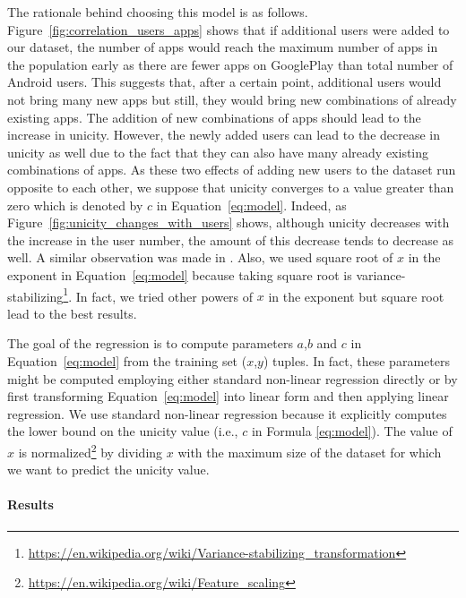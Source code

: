 \documentclass{acm_proc_article-sp}
\theoremstyle{plain}
\theoremstyle{plain}
\theoremstyle{plain}
\theoremstyle{plain}
\theoremstyle{plain}
\theoremstyle{plain}
\begin{document}
The rationale behind choosing this model is as follows. Figure~\ref{fig:correlation_users_apps} shows that if additional users were added to our dataset, the number of apps would reach the maximum number of apps in the population early as there are fewer apps on GooglePlay than total number of Android users.
This suggests that, after a certain point, additional users would not bring many new apps but still, they would bring new combinations of already existing apps.
The addition of new combinations of apps should lead to the increase in unicity. However, the newly added users can lead to the decrease in unicity as well due to the fact that they can also have many already existing combinations of apps.
As these two effects of adding new users to the dataset run opposite to each other, we suppose that unicity converges to a value greater than zero which is denoted by $c$ in Equation~\ref{eq:model}.
Indeed, as Figure~\ref{fig:unicity_changes_with_users} shows, although unicity decreases with the increase in the user number, the amount of this decrease tends to decrease as well.
A similar observation was made in \cite{Nature13}.
Also, we used square root of $x$ in the exponent in Equation~\ref{eq:model} because taking square root is variance-stabilizing\footnote{\url{https://en.wikipedia.org/wiki/Variance-stabilizing_transformation}}.
In fact, we tried other powers of $x$ in the exponent but square root lead to the best results.

The goal of the regression is to compute parameters $a$,$b$ and $c$ in Equation~\ref{eq:model} from the training set  ($x$,$y$) tuples.
In fact, these parameters might be computed employing either standard non-linear regression directly or by first transforming Equation~\ref{eq:model} into linear form and then applying linear regression.
We use standard non-linear regression because it explicitly computes the lower bound on the unicity value (i.e., $c$ in Formula \ref{eq:model}).
The value of $x$ is normalized\footnote{\url{https://en.wikipedia.org/wiki/Feature_scaling}} by dividing $x$ with the maximum size of the dataset for which we want to predict the unicity value.










\paragraph{Results}
\end{document}

